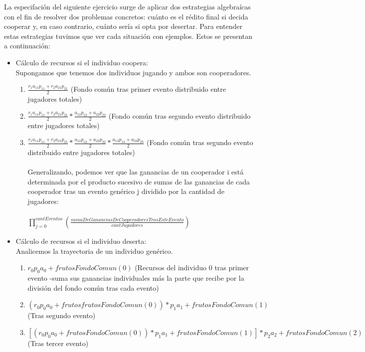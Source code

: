 \documentclass[10pt,a4paper]{article}
\begin{document}
La especifación del siguiente ejercicio surge de aplicar dos estrategias algebraícas con el fin de resolver dos problemas concretos: cuánto es el rédito final si decida cooperar y, en caso contrario, cuánto sería si opta por desertar. Para entender estas estrategias tuvimos que ver cada situación con ejemplos. Estos se presentan a continuación:
\begin{itemize}
    \item Cálculo de recursos si el individuo coopera:
    \\
    Supongamos que tenemos dos individuos jugando y ambos son cooperadores.
    \begin{enumerate} \setlength\itemsep{0cm}
	\item $\frac{r_1 a_{11} p_{11} + r_2 a_{21} p_{21}}{2}$ (Fondo común tras primer evento distribuido entre jugadores totales)
	\item $\frac{r_1 a_{11} p_{11} + r_2 a_{21} p_{21}}{2} * \frac{a_{12} p_{12} +a_{22} p_{22}}{2}$ (Fondo común tras segundo evento distribuido entre jugadores totales)
	\item $\frac{r_1 a_{11} p_{11} + r_2 a_{21} p_{21}}{2} * \frac{a_{12} p_{12} +a_{22} p_{22}}{2} * \frac{a_{13} p_{13} + a_{23} p_{23}}{2}$ (Fondo común tras segundo evento distribuido entre jugadores totales)
 \\ 
 \\
    Generalizando, podemos ver que las ganancias de un cooperador i está determinada por el producto sucesivo de sumas de las ganancias de cada cooperador tras un evento genérico j dividido por la cantidad de jugadores: \\
    \\
    $\prod_{j=0}^{cantEventos}{(\frac{sumaDeGananciasDeCooperadoresTrasEsteEvento}{cantJugadores})}$
    \\
\end{enumerate}
    \item Cálculo de recursos si el individuo deserta:
    \\
    Analicemos la trayectoria de un individuo genérico.
    \begin{enumerate} \setlength\itemsep{0cm}
	\item $r_0 p_0 a_0 + frutosFondoComun(0)$ (Recursos del individuo 0 tras primer evento -suma sus ganancias individuales más la parte que recibe por la división del fondo común tras cada evento)
	\item $(r_0 p_0 a_0 + frutosfrutosFondoComun(0)) * p_1 a_1 + frutosFondoComun(1)$ (Tras segundo evento)
	\item $[(r_0 p_0 a_0 + frutosFondoComun(0)) * p_1 a_1 + frutosFondoComun(1)] * p_2 a_2 + frutosFondoComun(2)$ (Tras tercer evento)\\

\end{enumerate}
\end{itemize}
\end{document}
